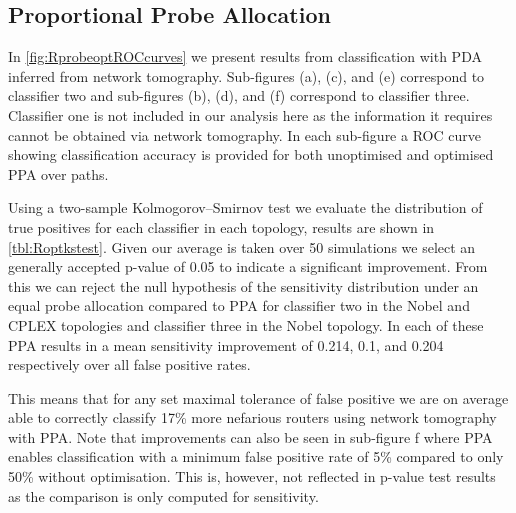 \subsection{Proportional Probe Allocation}
\label{ssec:Rprobeallocation}
In \cref{fig:RprobeoptROCcurves} we present results from classification with PDA inferred from network tomography. Sub-figures (a), (c), and (e) correspond to classifier two and sub-figures (b), (d), and (f) correspond to classifier three. Classifier one is not included in our analysis here as the information it requires cannot be obtained via network tomography. In each sub-figure a ROC curve showing classification accuracy is provided for both unoptimised and optimised PPA over paths.\par
Using a two-sample Kolmogorov–Smirnov test we evaluate the distribution of true positives for each classifier in each topology, results are shown in \cref{tbl:Roptkstest}. Given our average is taken over 50 simulations we select an generally accepted p-value of 0.05 to indicate a significant improvement. From this we can reject the null hypothesis of the sensitivity distribution under an equal probe allocation compared to PPA for classifier two in the Nobel and CPLEX topologies and classifier three in the Nobel topology. In each of these PPA results in a mean sensitivity improvement of 0.214, 0.1, and 0.204 respectively over all false positive rates.\par
This means that for any set maximal tolerance of false positive we are on average able to correctly classify 17\% more nefarious routers using network tomography with PPA. Note that improvements can also be seen in sub-figure f where PPA enables classification with a minimum false positive rate of 5\% compared to only 50\% without optimisation. This is, however, not reflected in p-value test results as the comparison is only computed for sensitivity.\par
\noindent
